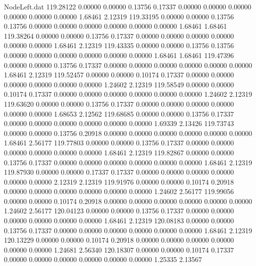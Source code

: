 \begin{filecontents}{NodeLeft.dat}
 119.28122    0.00000    0.00000     0.13756    0.17337    0.00000    0.00000    0.00000    0.00000    0.00000    0.00000    1.68461    2.12319
 119.33195    0.00000    0.00000     0.13756    0.13756    0.00000    0.00000    0.00000    0.00000    0.00000    0.00000    1.68461    1.68461
 119.38264    0.00000    0.00000     0.13756    0.17337    0.00000    0.00000    0.00000    0.00000    0.00000    0.00000    1.68461    2.12319
 119.43335    0.00000    0.00000     0.13756    0.13756    0.00000    0.00000    0.00000    0.00000    0.00000    0.00000    1.68461    1.68461
 119.47396    0.00000    0.00000     0.13756    0.17337    0.00000    0.00000    0.00000    0.00000    0.00000    0.00000    1.68461    2.12319
 119.52457    0.00000    0.00000     0.10174    0.17337    0.00000    0.00000    0.00000    0.00000    0.00000    0.00000    1.24602    2.12319
 119.58549    0.00000    0.00000     0.10174    0.17337    0.00000    0.00000    0.00000    0.00000    0.00000    0.00000    1.24602    2.12319
 119.63620    0.00000    0.00000     0.13756    0.17337    0.00000    0.00000    0.00000    0.00000    0.00000    0.00000    1.68653    2.12562
 119.68685    0.00000    0.00000     0.13756    0.17337    0.00000    0.00000    0.00000    0.00000    0.00000    0.00000    1.69339    2.13426
 119.73743    0.00000    0.00000     0.13756    0.20918    0.00000    0.00000    0.00000    0.00000    0.00000    0.00000    1.68461    2.56177
 119.77803    0.00000    0.00000     0.13756    0.17337    0.00000    0.00000    0.00000    0.00000    0.00000    0.00000    1.68461    2.12319
 119.82867    0.00000    0.00000     0.13756    0.17337    0.00000    0.00000    0.00000    0.00000    0.00000    0.00000    1.68461    2.12319
 119.87930    0.00000    0.00000     0.17337    0.17337    0.00000    0.00000    0.00000    0.00000    0.00000    0.00000    2.12319    2.12319
 119.91976    0.00000    0.00000     0.10174    0.20918    0.00000    0.00000    0.00000    0.00000    0.00000    0.00000    1.24602    2.56177
 119.99056    0.00000    0.00000     0.10174    0.20918    0.00000    0.00000    0.00000    0.00000    0.00000    0.00000    1.24602    2.56177
 120.04123    0.00000    0.00000     0.13756    0.17337    0.00000    0.00000    0.00000    0.00000    0.00000    0.00000    1.68461    2.12319
 120.08183    0.00000    0.00000     0.13756    0.17337    0.00000    0.00000    0.00000    0.00000    0.00000    0.00000    1.68461    2.12319
 120.13229    0.00000    0.00000     0.10174    0.20918    0.00000    0.00000    0.00000    0.00000    0.00000    0.00000    1.24681    2.56340
 120.18307    0.00000    0.00000     0.10174    0.17337    0.00000    0.00000    0.00000    0.00000    0.00000    0.00000    1.25335    2.13567

\end{filecontents}
